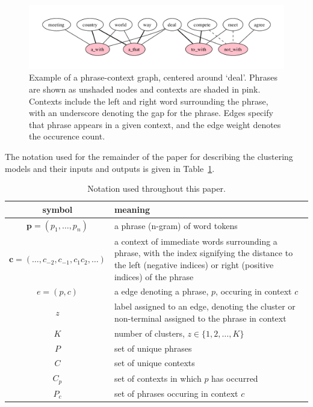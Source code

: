 \begin{figure}
\includegraphics[width=\textwidth]{deal}
\caption{Example of a phrase-context graph, centered around `deal'. Phrases are shown as unshaded nodes and contexts are shaded in pink. Contexts include the left and right word surrounding the phrase, with an underscore denoting the gap for the phrase. Edges specify that phrase appears in a given context, and the edge weight denotes the occurence count.}
\label{fig:bipartite}
\end{figure}

The notation used for the remainder of the paper for describing the clustering models and their inputs and outputs is given in Table~\ref{tab:notation}.

\begin{table}
\begin{tabular}{cp{}}
\toprule
  symbol & meaning \\
\midrule
  $\mathbf{p} = (p_1, \ldots, p_n)$ & a phrase (n-gram) of word tokens \\
  $\mathbf{c} = (\ldots, c_{-2}, c_{-1}, c_1 c_2, \ldots)$ & a context of immediate words surrounding a phrase, with the index signifying the distance to the left (negative indices) or right (positive indices) of the phrase \\
  $e = (p, c)$  & a edge denoting a phrase, $p$, occuring in context $c$ \\
  $z$ & label assigned to an edge, denoting the cluster or non-terminal assigned to the phrase in context \\
  $K$ & number of clusters, $z \in \{1,2, \ldots, K\}$ \\
  $P$ & set of unique phrases \\
  $C$ & set of unique contexts \\
  $C_p$ & set of contexts in which $p$ has occurred \\
  $P_c$ & set of phrases occuring in context $c$ \\
\bottomrule
\end{tabular}
\caption{Notation used throughout this paper.}
\label{tab:notation}
\end{table}

